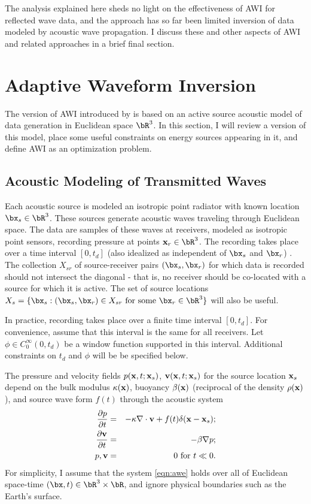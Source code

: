 The analysis explained here sheds no light on the effectiveness of AWI
for reflected wave data, and the approach has so far been limited
inversion of data modeled by acoustic wave propagation. I discuss
these and other aspects of AWI and related approaches in a brief final
section.

\section{Adaptive Waveform Inversion}

The version of AWI introduced by \cite{Warner:16} is based on an
active source acoustic model of data generation in Euclidean space
$\bR^3$. In this section, I will review a version of this model, place
some useful constraints on energy sources appearing in it, and define
AWI as an optimization problem.

\subsection{Acoustic Modeling of Transmitted Waves}

Each acoustic source is modeled an isotropic point radiator
with known location $\bx_s\in \bR^3$. These
sources generate acoustic waves traveling through Euclidean space. The
data are samples of these waves at receivers, modeled as isotropic
point sensors, recording pressure at points
${\bf x}_r \in \bR^3$. The recording takes place over a time interval
$[0,t_d]$ (also idealized as independent of $\bx_s$ and
$\bx_r$) . The collection $X_{sr}$ of source-receiver pairs
$(\bx_s,\bx_r)$ for which data is recorded should not intersect the
diagonal - that is, no receiver should be co-located with a source for
which it is active. The set of source locations $X_s = \{\bx_s: (\bx_s,\bx_r) \in X_{sr}
\mbox{ for some } \bx_r \in \bR^3\}$ will also be useful.

In practice, recording takes place over a finite time interval
$[0,t_d]$. For convenience, assume that this interval is the same for
all receivers. Let $\phi \in C_0^{\infty}(0,t_d)$ be a window function
supported in this interval. Additional constraints on $t_d$ and $\phi$
will be be specified below.

The pressure and velocity fields $p({\bf x},t;{\bf x}_s)$,
${\bf v}({\bf x},t;{\bf x}_s)$ for the source location ${\bf x}_s$
depend on the bulk modulus $\kappa({\bf x})$, buoyancy $\beta({\bf
  x})$ (reciprocal of the density $\rho({\bf x})$), and source wave
form $f(t)$ through the acoustic system
\begin{eqnarray}
  \label{eqn:awe}
 \frac{\partial p}{\partial t} & = &- \kappa \nabla \cdot {\bf v} +
                                    f(t) \delta({\bf x}-{\bf x}_s); \nonumber \\
\frac{\partial {\bf v}}{\partial t} & = & - \beta \nabla p; \\ 
p, {\bf v} & = & 0 \mbox{ for }  t \ll 0.
\end{eqnarray}
For simplicity, I assume that the system \ref{eqn:awe} holds over all of Euclidean
space-time $(\bx,t) \in \bR^3 \times \bR$, and ignore physical
boundaries such as the Earth's surface.

